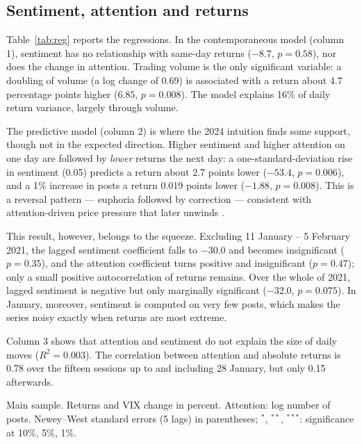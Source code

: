 \documentclass[11pt,a4paper]{article}
\begin{document}
\subsection{Sentiment, attention and returns}

Table~\ref{tab:reg} reports the regressions. In the contemporaneous model
(column 1), sentiment has no relationship with same-day returns ($-8.7$,
$p=0.58$), nor does the change in attention. Trading volume is the only
significant variable: a doubling of volume (a log change of 0.69) is associated
with a return about 4.7 percentage points higher ($6.85$, $p=0.008$). The model
explains 16\% of daily return variance, largely through volume.

The predictive model (column 2) is where the 2024 intuition finds some support,
though not in the expected direction. Higher sentiment and higher attention on
one day are followed by \emph{lower} returns the next day: a one-standard-deviation
rise in sentiment (0.05) predicts a return about 2.7 points lower ($-53.4$,
$p=0.006$), and a 1\% increase in posts a return 0.019 points lower
($-1.88$, $p=0.008$). This is a reversal pattern --- euphoria followed by
correction --- consistent with attention-driven price pressure that later unwinds
\citep{da2011}.

This result, however, belongs to the squeeze. Excluding 11 January -- 5 February
2021, the lagged sentiment coefficient falls to $-30.0$ and becomes insignificant
($p=0.35$), and the attention coefficient turns positive and insignificant
($p=0.47$); only a small positive autocorrelation of returns remains. Over the
whole of 2021, lagged sentiment is negative but only marginally significant
($-32.0$, $p=0.075$). In January, moreover, sentiment is computed on very few
posts, which makes the series noisy exactly when returns are most extreme.

Column 3 shows that attention and sentiment do not explain the size of daily
moves ($R^2=0.003$). The correlation between attention and absolute returns is
0.78 over the fifteen sessions up to and including 28 January, but only 0.15
afterwards.

\begin{table}[htbp]
\centering
\caption{GME returns, sentiment and attention}
\label{tab:reg}
\begin{small}

\end{small}
\par\smallskip\parbox{0.92\textwidth}{\footnotesize Main sample. Returns and VIX
change in percent. Attention: log number of posts. Newey--West standard errors (5
lags) in parentheses; $^{*}$, $^{**}$, $^{***}$: significance at 10\%, 5\%, 1\%.}
\end{table}
\end{document}

